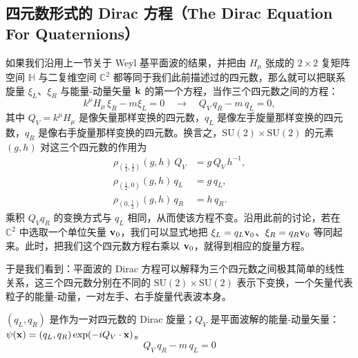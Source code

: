 \subsection{四元数形式的 Dirac 方程（The Dirac Equation For Quaternions）}

如果我们沿用上一节关于 Weyl 基平面波的结果，并把由 $H_{\mu}$ 张成的 $2\times2$ 复矩阵空间 $\mathbb{H}$ 与二复维空间 $\mathbb{C}^{2}$ 都等同于我们此前描述过的四元数，那么就可以把联系旋量 $\xi_{L}$、$\xi_{R}$ 与能量-动量矢量 $\mathbf{k}$ 的第一个方程，当作三个四元数之间的方程：
\begin{equation}
k^{\mu}H_{\mu}\,\xi_{R}-m\xi_{L}=0
\quad\longrightarrow\quad
Q_{V}\,q_{R}-m\,q_{L}=0,
\end{equation}
其中 $Q_{V}=k^{\mu}H_{\mu}$ 是像矢量那样变换的四元数，$q_{L}$ 是像左手旋量那样变换的四元数，$q_{R}$ 是像右手旋量那样变换的四元数。换言之，$\mathrm{SU}(2)\times\mathrm{SU}(2)$ 的元素 $(g,h)$ 对这三个四元数的作用为
\begin{align}
\rho_{(\tfrac12,\tfrac12)}(g,h)\,Q_{V} &= g\,Q_{V}\,h^{-1},\\
\rho_{(\tfrac12,0)}(g,h)\,q_{L} &= g\,q_{L},\\
\rho_{(0,\tfrac12)}(g,h)\,q_{R} &= h\,q_{R}.
\end{align}
乘积 $Q_{V}q_{R}$ 的变换方式与 $q_{L}$ 相同，从而使该方程不变。沿用此前的讨论，若在 $\mathbb{C}^{2}$ 中选取一个单位矢量 $\mathbf{v}_{0}$，我们可以显式地把 $\xi_{L}=q_{L}\mathbf{v}_{0}$、$\xi_{R}=q_{R}\mathbf{v}_{0}$ 等同起来。此时，把我们这个四元数方程右乘以 $\mathbf{v}_{0}$，就得到相应的旋量方程。

于是我们看到：平面波的 Dirac 方程可以解释为三个四元数之间极其简单的线性关系，这三个四元数分别在不同的 $\mathrm{SU}(2)\times\mathrm{SU}(2)$ 表示下变换，一个矢量代表粒子的能量-动量，一对左手、右手旋量代表波本身。

\begin{keybox}
$(q_{L},q_{R})$ 是作为一对四元数的 Dirac 旋量；$Q_{V}$ 是平面波解的能量-动量矢量：$\psi(\mathbf{x})=(q_{L},q_{R})\exp(-iQ_{V}\cdot\mathbf{x})$。
\begin{equation}
Q_{V}\,q_{R}-m\,q_{L}=0 \tag{Riemannian}
\end{equation}
\end{keybox}

